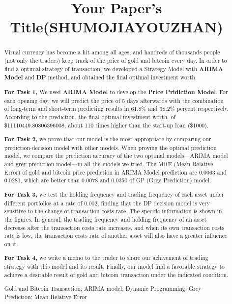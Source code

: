\documentclass{mcmthesis}
\title{Your Paper's Title(SHUMOJIAYOUZHAN)}
\begin{document}
\begin{abstract}
Virual currency has become a hit among all ages, and handreds of thousands people (not only the traders) keep track of the price of gold and bitcoin every day. In order to find a optimal strategy of transaction, we developed a Strategy Model with \textbf{ARIMA Model} and \textbf{DP} method, and obtained the final optimal investment worth. 
\par \textbf{For Task 1,} We used \textbf{ARIMA Model} to develop the \textbf{Price Pridiction Model}. For each opening day, we will predict the price of 5 days afterwards with the combination of long-term and short-term predicting results in 61.8\% and 38.2\% percent respectively. According to the prediction,
the final optimal investment worth. of \$11110449.80806396008, about 110 times higher than the start-up loan (\$1000).
\par \textbf{For Task 2,} we prove that our model is the most appropriate by comparing our prediction-decision model with other models. When proving the optimal prediction model, we compare the prediction accuracy of the two optimal models---ARIMA model and grey prediction model---in all the models we tried. The MRE (Mean Relative Error) of gold and bitcoin price prediction in ARIMA Model prediction are 0.0063 and 0.0281, which are better than 0.0078 and 0.0350 of GP (Grey Prediction) model. 
\par \textbf{For Task 3,} we test the holding frequency and trading frequency of each asset under different portfolios at a rate of 0.002, finding that the DP decision model is very sensitive to the change of transaction costs rate. The specific information is shown in the figures. In general, the trading frequency and holding frequency of an asset decrease after the transaction costs rate increases, and when its own transaction costs rate is low, the transaction costs rate of another asset will also have a greater influence on it.
\par \textbf{For Task 4,} we write a memo to the trader to share our achivement of trading strategy with this model and its result.
Finally, our model find a favorable strategy to achieve a desirable result of gold and bitcoin transaction under the indicated condition.

\begin{keywords}
Gold and Bitcoin Transaction; ARIMA model; Dynamic Programming; Grey Prediction; Mean Relative Error
\end{keywords}
\end{abstract}
\maketitle
 \tableofcontents
 \newpage
\end{document}
